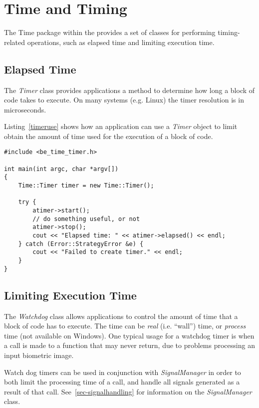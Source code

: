 %
%
\chapter{Time and Timing}
\label{chp-time}

The Time package within the \lname provides a set of classes for performing
timing-related operations, such as elapsed time and limiting execution time.

\section{Elapsed Time}

The {\em Timer} class provides applications a method to determine how long
a block of code takes to execute. On many systems (e.g. Linux) the timer
resolution is in microseconds.

Listing~\ref{timeruse} shows how an application can use a {\em Timer}
object to limit obtain the amount of time used for the execution of a block
of code.

\lstset{language=c++}
\begin{lstlisting}[caption={Using the Timer}, label=timeruse]
#include <be_time_timer.h>

int main(int argc, char *argv[])
{
	Time::Timer timer = new Time::Timer();

	try {
		atimer->start();
		// do something useful, or not
		atimer->stop();
		cout << "Elapsed time: " << atimer->elapsed() << endl;
	} catch (Error::StrategyError &e) {
		cout << "Failed to create timer." << endl;
	}
}
\end{lstlisting}

\section{Limiting Execution Time}

The {\em Watchdog} class allows applications to control the amount of time
that a block of code has to execute. The time can be {\em real} (i.e. ``wall'')
time, or {\em process} time (not available on Windows). One typical usage for
a watchdog timer is when a call is made to a function that may never return,
due to problems processing an input biometric image.

Watch dog timers can be used in conjunction with {\em SignalManager} in
order to both limit the processing time of a call, and handle all signals
generated as a result of that call. See~\ref{sec-signalhandling} for
information on the {\em SignalManager} class.

